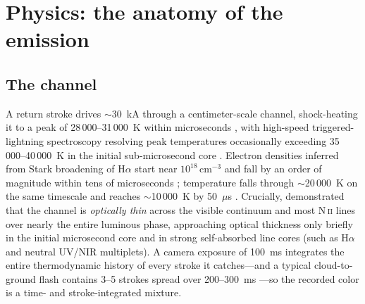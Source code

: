\documentclass[11pt,a4paper]{article}
\begin{document}
\section{Physics: the anatomy of the emission}
\label{sec:physics}

\subsection{The channel}
A return stroke drives $\sim$30~kA through a centimeter-scale channel,
shock-heating it to a peak of 28\,000--31\,000~K within microseconds
\citep{prueitt1963,orville1968,rakovuman2003}, with high-speed triggered-lightning
spectroscopy resolving peak temperatures occasionally exceeding 35\,000--40\,000~K
in the initial sub-microsecond core \citep{walker2017,walker2019}. Electron
densities inferred from Stark broadening of H$\alpha$ start near
$10^{18}\,\mathrm{cm^{-3}}$ and fall by an order of magnitude within tens of
microseconds \citep{uman1964}; temperature falls through $\sim$20\,000~K on
the same timescale and reaches $\sim$10\,000~K by 50~$\mu$s \citep{orville1968}.
Crucially, \citet{uman1965} demonstrated that the channel is \emph{optically
thin} across the visible continuum and most N\,\textsc{ii} lines over nearly
the entire luminous phase, approaching optical thickness only briefly in the
initial microsecond core and in strong self-absorbed line cores (such as
H$\alpha$ and neutral UV/NIR multiplets). A camera exposure of 100~ms
integrates the entire thermodynamic history of every stroke it catches---and a
typical cloud-to-ground flash contains 3--5 strokes spread over 200--300~ms
\citep{rakovuman2003}---so the recorded color is a time- and
stroke-integrated mixture.
\end{document}
